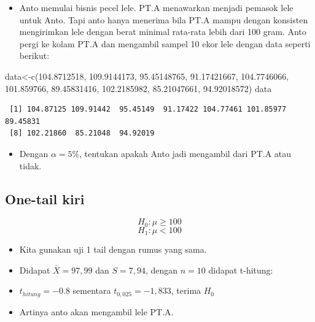 \documentclass[
  letterpaper,
  DIV=11,
  numbers=noendperiod]{scrartcl}
\newenvironment{Shaded}{\begin{snugshade}}{\end{snugshade}}
\newcommand{\FloatTok}[1]{\textcolor[rgb]{0.68,0.00,0.00}{#1}}
\newcommand{\FunctionTok}[1]{\textcolor[rgb]{0.28,0.35,0.67}{#1}}
\newcommand{\NormalTok}[1]{\textcolor[rgb]{0.00,0.23,0.31}{#1}}
\newcommand{\OtherTok}[1]{\textcolor[rgb]{0.00,0.23,0.31}{#1}}
\providecommand{\tightlist}{%
  \setlength{\itemsep}{0pt}\setlength{\parskip}{0pt}}\usepackage{longtable,booktabs,array}
\begin{document}
\begin{itemize}
\tightlist
\item
  Anto memulai bisnis pecel lele. PT.A menawarkan menjadi pemasok lele
  untuk Anto. Tapi anto hanya menerima bila PT.A mampu dengan konsisten
  mengirimkan lele dengan berat minimal rata-rata lebih dari 100 gram.
  Anto pergi ke kolam PT.A dan mengambil sampel 10 ekor lele dengan data
  seperti berikut:
\end{itemize}

\begin{Shaded}
\begin{Highlighting}[]
\NormalTok{data}\OtherTok{\textless{}{-}}\FunctionTok{c}\NormalTok{(}\FloatTok{104.8712518}\NormalTok{,    }\FloatTok{109.9144173}\NormalTok{,    }\FloatTok{95.45148765}\NormalTok{,    }\FloatTok{91.17421667}\NormalTok{,    }\FloatTok{104.7746066}\NormalTok{,    }\FloatTok{101.859766}\NormalTok{, }\FloatTok{89.45831416}\NormalTok{,    }\FloatTok{102.2185982}\NormalTok{,    }\FloatTok{85.21047661}\NormalTok{,    }\FloatTok{94.92018572}\NormalTok{)}
\NormalTok{data}
\end{Highlighting}
\end{Shaded}

\begin{verbatim}
 [1] 104.87125 109.91442  95.45149  91.17422 104.77461 101.85977  89.45831
 [8] 102.21860  85.21048  94.92019
\end{verbatim}

\begin{itemize}
\tightlist
\item
  Dengan \(\alpha=5\%\), tentukan apakah Anto jadi mengambil dari PT.A
  atau tidak.
\end{itemize}

\hypertarget{one-tail-kiri}{%
\subsection{One-tail kiri}\label{one-tail-kiri}}

\[
H_0: \mu \geq 100
\] \[
H_1: \mu < 100
\]

\begin{itemize}
\item
  Kita gunakan uji 1 tail dengan rumus yang sama.
\item
  Didapat \(\bar{X}=97,99\) dan \(S=7,94\), dengan \(n=10\) didapat
  t-hitung:
\item
  \(t_{hitung}=-0.8\) sementara \(t_{0,025}=-1,833\), terima \(H_0\)
\item
  Artinya anto akan mengambil lele PT.A.
\end{itemize}
\end{document}
